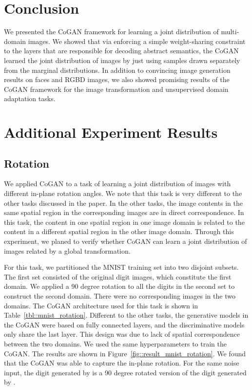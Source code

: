 \documentclass{article}
\begin{document}
\section{Conclusion}\label{sec::conc}

We presented the CoGAN framework for learning a joint distribution of multi-domain images. We showed that via enforcing a simple weight-sharing constraint to the layers that are responsible for decoding abstract semantics, the CoGAN learned the joint distribution of images by just using samples drawn separately from the marginal distributions. In addition to convincing image generation results on faces and RGBD images, we also showed promising results of the CoGAN framework for the image transformation and unsupervised domain adaptation tasks.
 
{
\small


}


\clearpage
\appendix
\clearpage

\section{Additional Experiment Results}\label{subsec::digits}

\subsection{Rotation}

We applied CoGAN to a task of learning a joint distribution of images with different in-plane rotation angles. We note that this task is very different to the other tasks discussed in the paper. In the other tasks, the image contents in the same spatial region in the corresponding images are in direct correspondence. In this task, the content in one spatial region in one image domain is related to the content in a different spatial region in the other image domain. Through this experiment, we planed to verify whether CoGAN can learn a joint distribution of images related by a global transformation.

For this task, we partitioned the MNIST training set into two disjoint subsets. The first set consisted of the original digit images, which constitute the first domain. We applied a 90 degree rotation to all the digits in the second set to construct the second domain. There were no corresponding images in the two domains. The CoGAN architecture used for this task is shown in Table~\ref{tbl::mnist_rotation}. Different to the other tasks, the generative models in the CoGAN were based on fully connected layers, and the discriminative models only share the last layer. This design was due to lack of spatial correspondence between the two domains. We used the same hyperparameters to train the CoGAN. The results are shown in Figure~\ref{fig::result_mnist_rotation}. We found that the CoGAN was able to capture the in-plane rotation. For the same noise input, the digit generated by  is a 90 degree rotated version of the digit generated by .
\end{document}
